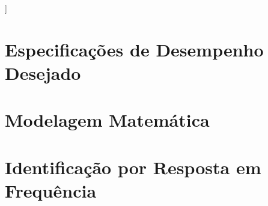 \documentclass[conference,harvard,brazil,english]{sbatex}
\begin{document}
]








\section{Especificações de Desempenho Desejado}


\section{Modelagem Matemática}


\section{Identificação por Resposta em Frequência} 


\nocite{*}

\cite{mozelli2020}
\cite{oliveira2011}
\cite{parks1999}
\end{document}
